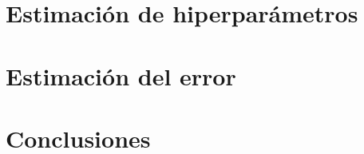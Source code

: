 \documentclass[a4paper, 20pt]{article}
\begin{document}
\section{Estimación de hiperparámetros}

\section{Estimación del error}

\section{Conclusiones}
\newpage

\printbibliography
\end{document}
